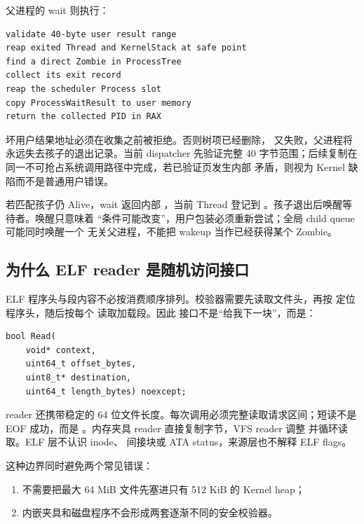 父进程的 wait 则执行：

\begin{lstlisting}[caption={wait 不能先消费再验证用户指针}]
validate 40-byte user result range
reap exited Thread and KernelStack at safe point
find a direct Zombie in ProcessTree
collect its exit record
reap the scheduler Process slot
copy ProcessWaitResult to user memory
return the collected PID in RAX
\end{lstlisting}

坏用户结果地址必须在收集之前被拒绝。否则树项已经删除，
又失败，父进程将永远失去孩子的退出记录。当前 dispatcher 先验证完整 40
字节范围；后续复制在同一不可抢占系统调用路径中完成，若已验证页发生内部
矛盾，则视为 Kernel 缺陷而不是普通用户错误。

若匹配孩子仍 Alive，wait 返回内部 ，当前 Thread 登记到
。孩子退出后唤醒等待者。唤醒只意味着
“条件可能改变”，用户包装必须重新尝试；全局 child queue 可能同时唤醒一个
无关父进程，不能把 wakeup 当作已经获得某个 Zombie。

\subsection{为什么 ELF reader 是随机访问接口}

ELF 程序头与段内容不必按消费顺序排列。校验器需要先读取文件头，再按
 定位程序头，随后按每个  读取加载段。因此
接口不是“给我下一块”，而是：

\begin{lstlisting}[caption={来源无关的 ELF 精确读取契约}]
bool Read(
    void* context,
    uint64_t offset_bytes,
    uint8_t* destination,
    uint64_t length_bytes) noexcept;
\end{lstlisting}

reader 还携带稳定的 64 位文件长度。每次调用必须完整读取请求区间；短读不是
EOF 成功，而是 。内存夹具 reader 直接复制字节，VFS
reader 调整  并循环读取。ELF 层不认识 inode、
间接块或 ATA status，来源层也不解释 ELF flags。

这种边界同时避免两个常见错误：

\begin{enumerate}
  \item 不需要把最大 64 MiB 文件先塞进只有 512 KiB 的 Kernel heap；
  \item 内嵌夹具和磁盘程序不会形成两套逐渐不同的安全校验器。
\end{enumerate}

